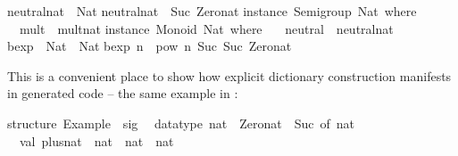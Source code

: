 \begin{isabellebody}
\begin{isamarkuptext}
\isanewline
neutral{}nat\ {}{}\ Nat{}\isanewline
neutral{}nat\ {}\ Suc\ Zero{}nat{}\isanewline
\isanewline
instance\ Semigroup\ Nat\ where\ {}\isanewline
\ \ mult\ {}\ mult{}nat{}\isanewline
{}{}\isanewline
\isanewline
instance\ Monoid\ Nat\ where\ {}\isanewline
\ \ neutral\ {}\ neutral{}nat{}\isanewline
{}{}\isanewline
\isanewline
bexp\ {}{}\ Nat\ {}{}\ Nat{}\isanewline
bexp\ n\ {}\ pow\ n\ {}Suc\ {}Suc\ Zero{}nat{}{}{}\isanewline
\isanewline
{}\isanewline%
\end{isamarkuptext}%
\isamarkuptrue%
%
\endisatagquotetypewriter
{\isafoldquotetypewriter}%
%
\isadelimquotetypewriter
%
\endisadelimquotetypewriter
%
\begin{isamarkuptext}%
\noindent This is a convenient place to show how explicit dictionary
  construction manifests in generated code -- the same example in
  :%
\end{isamarkuptext}%
\isamarkuptrue%
%
\isadelimquotetypewriter
%
\endisadelimquotetypewriter
%
\isatagquotetypewriter
%
\begin{isamarkuptext}%
structure\ Example\ {}\ sig\isanewline
\ \ datatype\ nat\ {}\ Zero{}nat\ {}\ Suc\ of\ nat\isanewline
\ \ val\ plus{}nat\ {}\ nat\ {}{}\ nat\ {}{}\ nat\isanewline

\end{isamarkuptext}
\end{isabellebody}
